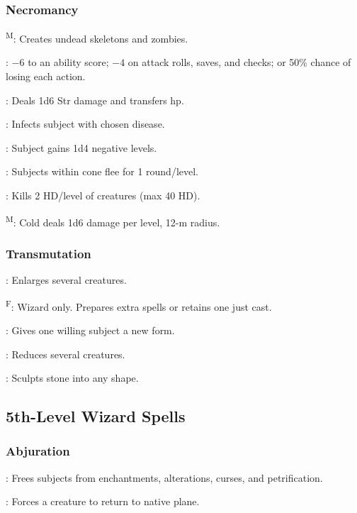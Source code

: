 \subsubsection{Necromancy}
	\textsuperscript{M}: Creates undead skeletons and zombies.

	: $-6$ to an ability score; $-4$ on attack rolls, saves, and checks; or 50\% chance of losing each action.

	: Deals 1d6 Str damage and transfers hp. %

	: Infects subject with chosen disease.

	: Subject gains 1d4 negative levels.

	: Subjects within cone flee for 1 round/level.

	: Kills 2 HD/level of creatures (max 40 HD). %

	\textsuperscript{M}: Cold deals 1d6 damage per level, 12-m radius. %

\subsubsection{Transmutation}
	: Enlarges several creatures.

	\textsuperscript{F}: Wizard only. Prepares extra spells or retains one just cast.

	: Gives one willing subject a new form.

	: Reduces several creatures.

	: Sculpts stone into any shape.



\subsection{5th-Level Wizard Spells}

\subsubsection{Abjuration}
	: Frees subjects from enchantments, alterations, curses, and petrification.

	: Forces a creature to return to native plane.

